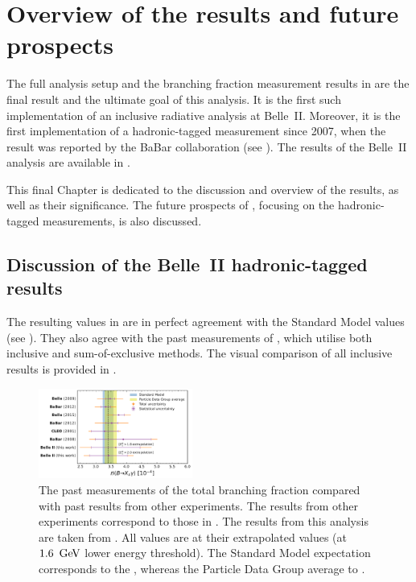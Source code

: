 \chapter{Overview of the results and future prospects}\label{ch:overview}

The full analysis setup and the branching fraction measurement results in 
are the final result and the ultimate goal of this analysis.
It is the first such implementation of an inclusive radiative analysis at Belle~II.
Moreover, it is the first implementation of a hadronic-tagged \BtoXsgamma measurement since 2007, 
when the result was reported by the BaBar collaboration (see ).
The results of the Belle~II analysis are available in \cite{Belle-II:2022hys}.

This final Chapter is dedicated to the discussion and overview of the results, as well as their significance.
The future prospects of \BtoXsgamma, focusing on the hadronic-tagged measurements, is also discussed.

\section{Discussion of the Belle~II hadronic-tagged \texorpdfstring{\BtoXsgamma}{B->Xs gamma} results}\label{sec:result_discussion}

The resulting values in  are in perfect agreement with the Standard Model values (see ).
They also agree with the past measurements of \BtoXsgamma, which utilise both inclusive and sum-of-exclusive methods.
The visual comparison of all inclusive results is provided in .
\begin{figure}[htbp!]
    \centering
    \includegraphics[width=0.45\textwidth]{figures/results_discussion/all_measurements_compared.pdf}
    \caption{\label{fig:measurement_comparison}
        The past measurements of the total branching fraction compared with past results from other experiments.
        The results from other experiments correspond to those in .
        The results from this analysis are taken from .
        All values are at their extrapolated values (at $1.6~\mathrm{\,Ge\kern -0.1em V}$ lower energy threshold).
        The Standard Model expectation corresponds to the ,
        whereas the Particle Data Group average to .
    }
\end{figure}

